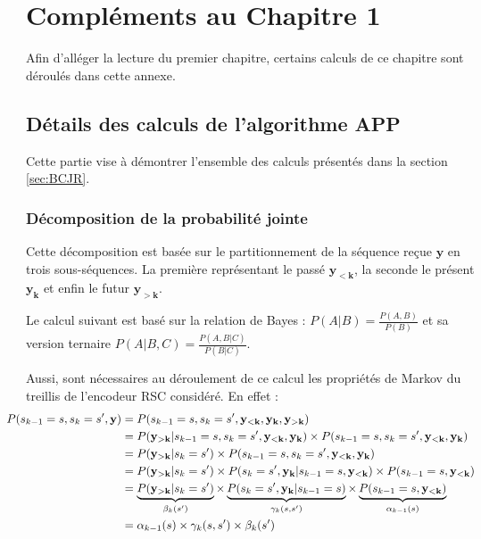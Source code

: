 
\appendix

\chapter{Compléments au Chapitre 1}
Afin d'alléger la lecture du premier chapitre, certains calculs de ce chapitre sont déroulés dans cette annexe.
\section{Détails des calculs de l'algorithme APP}\label{append:app}
Cette partie vise à démontrer l'ensemble des calculs présentés dans la section \ref{sec:BCJR}.
\subsection{Décomposition de la probabilité jointe} 
Cette décomposition est basée sur le partitionnement de la séquence reçue $\mathbf{y}$ en trois sous-séquences. La première représentant le passé $ \mathbf{y_{<k}}$, la seconde le présent $\mathbf{y_{k}} $ et enfin le futur $ \mathbf{y_{>k}}$.

Le calcul suivant est basé sur la relation de Bayes : $P(A|B) = \frac{P(A,B)}{P(B)}$ et sa version ternaire $P(A|B,C) = \frac{P(A,B|C)}{P(B|C)}$.

Aussi, sont nécessaires au déroulement de ce calcul les propriétés de Markov du treillis de l'encodeur RSC considéré. En effet :
\begin{align*}
	\hspace*{-4ex}
	P(s_{k-1}=s, s_{k}=s',\mathbf{y}) & = P(s_{k-1}=s, s_{k}=s',\mathbf{y_{<k}},\mathbf{y_{k}},\mathbf{y_{>k}})                                                                                                                             \\
	                                  & = P(\mathbf{y_{>k}}|s_{k-1}=s, s_{k}=s',\mathbf{y_{<k}},\mathbf{y_{k}})\times P(s_{k-1}=s, s_{k}=s',\mathbf{y_{<k}},\mathbf{y_{k}})                                                                 \\
	                                  & =P(\mathbf{y_{>k}}|s_{k}=s')\times P(s_{k-1}=s, s_{k}=s',\mathbf{y_{<k}},\mathbf{y_{k}})                                                                                                            \\
	                                  & =P(\mathbf{y_{>k}}|s_{k}=s')\times P(s_{k}=s',\mathbf{y_{k}}|s_{k-1}=s,\mathbf{y_{<k}})\times P(s_{k-1}=s,\mathbf{y_{<k}})                                                                          \\
	                                  & = \underbrace{P(\mathbf{y_{>k}}|s_{k}=s')}_{\beta_k(s')}\times \underbrace{P(s_{k}=s',\mathbf{y_{k}}|s_{k-1}=s)}_{\gamma_k(s,s')}\times \underbrace{P(s_{k-1}=s,\mathbf{y_{<k}})}_{\alpha_{k-1}(s)} \\
	                                  & = \alpha_{k-1}(s) \times \gamma_k(s,s') \times \beta_k(s')                                                                                                                                          
\end{align*}


